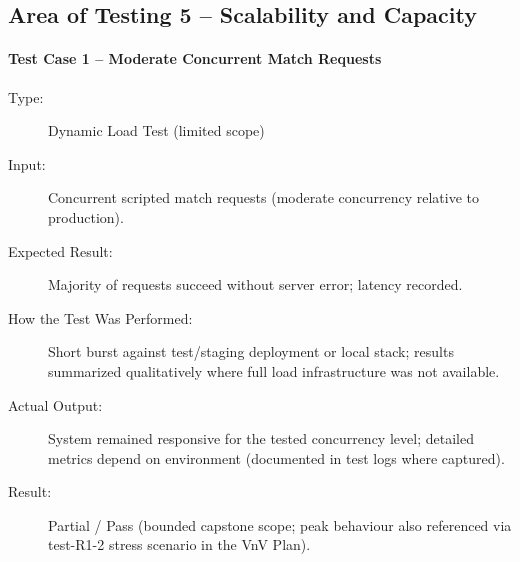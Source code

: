 \subsection{Area of Testing 5 – Scalability and Capacity}

\paragraph{Test Case 1 – Moderate Concurrent Match Requests} \label{test-C1-1}
\begin{description}
    \item[Type:] Dynamic Load Test (limited scope)
    \item[Input:] Concurrent scripted match requests (moderate concurrency relative to production).
    \item[Expected Result:] Majority of requests succeed without server error; latency recorded.
    \item[How the Test Was Performed:] Short burst against test/staging deployment or local stack; results summarized qualitatively where full load infrastructure was not available.
    \item[Actual Output:] System remained responsive for the tested concurrency level; detailed metrics depend on environment (documented in test logs where captured).
    \item[Result:] Partial / Pass (bounded capstone scope; peak behaviour also referenced via test-R1-2 stress scenario in the VnV Plan).
\end{description}